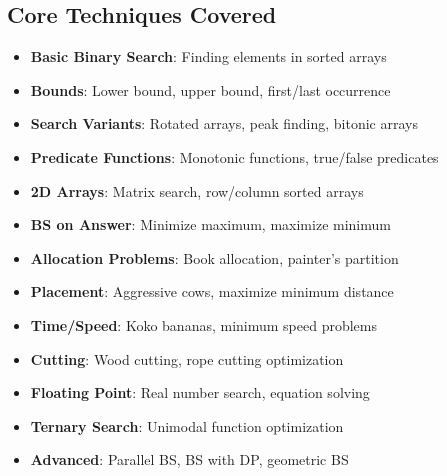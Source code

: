 \documentclass[11pt,a4paper,oneside]{book}
\begin{document}
\begin{tcolorbox}[
    enhanced,
    colback=lightgray,
    colframe=primaryblue,
    boxrule=2pt,
    arc=4mm
]
\section*{Core Techniques Covered}
\begin{itemize}[leftmargin=*, itemsep=8pt]
    \item[\textcolor{primaryblue}{$\blacktriangleright$}] \textbf{Basic Binary Search}: Finding elements in sorted arrays
    \item[\textcolor{primaryblue}{$\blacktriangleright$}] \textbf{Bounds}: Lower bound, upper bound, first/last occurrence
    \item[\textcolor{primaryblue}{$\blacktriangleright$}] \textbf{Search Variants}: Rotated arrays, peak finding, bitonic arrays
    \item[\textcolor{primaryblue}{$\blacktriangleright$}] \textbf{Predicate Functions}: Monotonic functions, true/false predicates
    \item[\textcolor{primaryblue}{$\blacktriangleright$}] \textbf{2D Arrays}: Matrix search, row/column sorted arrays
    \item[\textcolor{primaryblue}{$\blacktriangleright$}] \textbf{BS on Answer}: Minimize maximum, maximize minimum
    \item[\textcolor{primaryblue}{$\blacktriangleright$}] \textbf{Allocation Problems}: Book allocation, painter's partition
    \item[\textcolor{primaryblue}{$\blacktriangleright$}] \textbf{Placement}: Aggressive cows, maximize minimum distance
    \item[\textcolor{primaryblue}{$\blacktriangleright$}] \textbf{Time/Speed}: Koko bananas, minimum speed problems
    \item[\textcolor{primaryblue}{$\blacktriangleright$}] \textbf{Cutting}: Wood cutting, rope cutting optimization
    \item[\textcolor{primaryblue}{$\blacktriangleright$}] \textbf{Floating Point}: Real number search, equation solving
    \item[\textcolor{primaryblue}{$\blacktriangleright$}] \textbf{Ternary Search}: Unimodal function optimization
    \item[\textcolor{primaryblue}{$\blacktriangleright$}] \textbf{Advanced}: Parallel BS, BS with DP, geometric BS
\end{itemize}
\end{tcolorbox}
\end{document}
